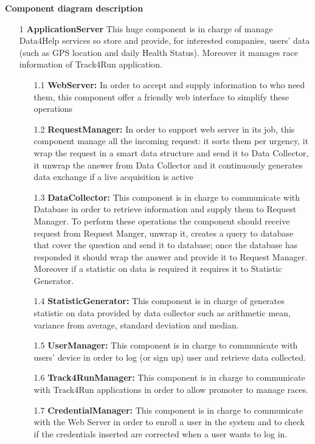 {\large \textbf{Component diagram description}}
\begin{enumerate}
\item [1] \textbf{ApplicationServer} 
This huge component is in charge of manage Data4Help services so store and provide, for interested companies, users’ data (such as GPS location and daily Health Status). Moreover it manages race information of Track4Run application.

	\begin{enumerate}
	\item [1.1] \textbf{WebServer:} In order to accept and supply information to who need them, this component offer a friendly web interface to simplify these operations
		
	\item [1.2] \textbf{RequestManager:} In order to support web server in its job, this component manage all the incoming request: it sorts them per urgency, it wrap the request in a smart data structure and send it to Data Collector, it unwrap the answer from Data Collector and it continuously generates data exchange if a live acquisition is active
		
	\item [1.3] \textbf{DataCollector: } This component is in charge to communicate with Database in order to retrieve information and supply them to Request Manager. To perform these operations the component should receive request from Request Manger, unwrap it, creates a query to database that cover the question and send it to database; once the database has responded it should wrap the answer and provide it to Request Manager. Moreover if a statistic on data is required it requires it to Statistic Generator.
		
	\item [1.4] \textbf{StatisticGenerator: } This component is in charge of generates statistic on data provided by data collector such as arithmetic mean, variance from average, standard deviation and median.

	\item [1.5] \textbf{UserManager: } This component is in charge to communicate with users' device in order to log (or sign up) user and retrieve data collected.

	\item [1.6] \textbf{Track4RunManager: } This component is in charge to communicate with Track4Run applications in order to allow promoter to manage races.
	
	\item [1.7] \textbf{CredentialManager: } This component is in charge to communicate with the Web Server in order to enroll a user in the system and to check if the credentials inserted are corrected when a user wants to log in.
	

\end{enumerate}
\end{enumerate}
